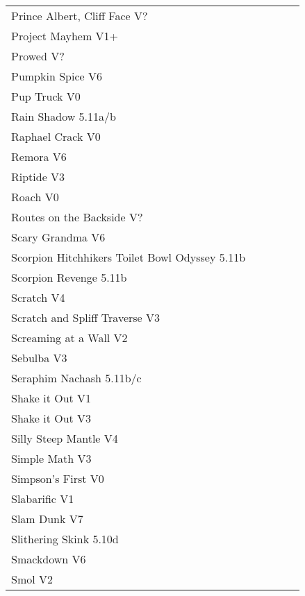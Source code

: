 \begin{flushleft}
\begin{center}
\begin{supertabular}{p{0.76\linewidth}p{0.08\linewidth}}
Prince Albert, Cliff Face V? & \pageref{rt:PA 2} \\
Project Mayhem V1+ & \pageref{rt:Project Mayhem} \\
Prowed V? & \pageref{vr:Prowed} \\
Pumpkin Spice V6 & \pageref{rt:Pumpkin Spice} \\
Pup Truck V0 & \pageref{rt:Pup Truck} \\
Rain Shadow 5.11a/b & \pageref{rt:Rain Shadow} \\
Raphael Crack V0 & \pageref{rt:Raphael Crack} \\
Remora V6 & \pageref{rt:Remora} \\
Riptide V3 & \pageref{rt:Riptide} \\
Roach V0 & \pageref{rt:Roach} \\
Routes on the Backside V? & \pageref{rt:Backside of Office} \\
Scary Grandma V6 & \pageref{rt:Scary Grandma} \\
Scorpion Hitchhikers Toilet Bowl Odyssey 5.11b & \pageref{rt:Scorpion Hitchhikers Toilet Bowl Odyssey} \\
Scorpion Revenge 5.11b & \pageref{rt:Scorpion Revenge} \\
Scratch V4 & \pageref{rt:Scratch} \\
Scratch and Spliff Traverse V3 & \pageref{rt:Scratch and Spliff Traverse} \\
Screaming at a Wall V2 & \pageref{rt:Screaming at a Wall} \\
Sebulba V3 & \pageref{vr:Sebulba} \\
Seraphim Nachash 5.11b/c & \pageref{rt:Seraphim Nachash} \\
Shake it Out V1 & \pageref{rt:Shake it Out Frank} \\
Shake it Out V3 & \pageref{vr:Shake it Out} \\
Silly Steep Mantle V4 & \pageref{rt:Silly Steep Mantle} \\
Simple Math V3 & \pageref{rt:Simple Math} \\
Simpson's First V0 & \pageref{rt:Simpson's First} \\
Slabarific V1 & \pageref{rt:Slabarific} \\
Slam Dunk V7 & \pageref{rt:Slam Dunk} \\
Slithering Skink 5.10d & \pageref{rt:Slithering Skink} \\
Smackdown V6 & \pageref{rt:Smackdown} \\
Smol V2 & \pageref{rt:Smol} \\

\end{supertabular}
\end{center}
\end{flushleft}
